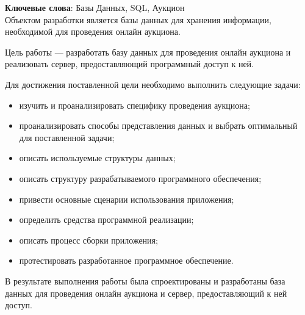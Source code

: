 \begin{essay}{}
    \noindent\textbf{Ключевые слова}: Базы Данных, SQL, Аукцион \\
        
    Объектом разработки является базы данных для хранения информации, необходимой для проведения онлайн аукциона.
    
    
    
    
    Цель работы --- разработать базу данных для проведения онлайн аукциона и реализовать сервер, предоставляющий программный доступ к ней.

    Для достижения поставленной цели необходимо выполнить следующие задачи:
    
    \begin{itemize}
        \item изучить и проанализировать специфику проведения аукциона;
        \item проанализировать способы представления данных и выбрать оптимальный для поставленной задачи;
        \item описать используемые структуры данных;
        \item описать структуру разрабатываемого программного обеспечения;
        \item привести основные сценарии использования приложения;
        \item определить средства программной реализации;
        \item описать процесс сборки приложения;
        \item протестировать разработанное программное обеспечение.
    \end{itemize}
    
    В результате выполнения работы была спроектированы и разработаны база данных для проведения онлайн аукциона и сервер, предоставляющий к ней доступ.
\end{essay}